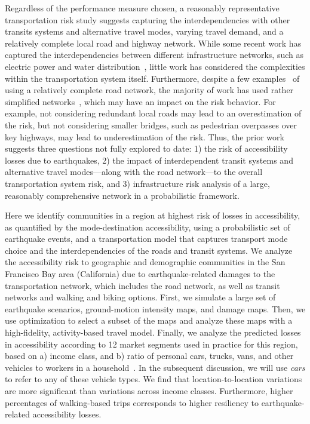 Regardless of the performance measure chosen, a reasonably representative transportation risk study suggests capturing the interdependencies with other transits systems and alternative travel modes, varying travel demand, and a relatively complete local road and highway network. While some recent work has captured the interdependencies between different infrastructure networks, such as electric power and water distribution~\cite{duenas-osorio_seismic_2007}, little work has considered the complexities within the transportation system itself. Furthermore, despite a few examples~\cite[e.g.,][]{kiremidjian_seismic_2007} of using a relatively complete road network, the majority of work has used rather simplified networks~\cite[e.g.,][]{lee_post-hazard_2011,jayaram_efficient_2010}, which may have an impact on the risk behavior. For example, not considering redundant local roads may lead to an overestimation of the risk, but not considering smaller bridges, such as pedestrian overpasses over key highways, may lead to underestimation of the risk. 
Thus, the prior work suggests three questions not fully explored to date: 1) the risk of accessibility losses due to earthquakes, 2) the impact of interdependent transit systems and alternative travel modes---along with the road network---to the overall transportation system risk, and 3) infrastructure risk analysis of a large, reasonably comprehensive network in a probabilistic framework.

Here we identify communities in a region at highest risk of losses in accessibility, as quantified by the mode-destination accessibility, using a probabilistic set of earthquake events, and a transportation model that captures transport mode choice and the interdependencies of the roads and transit systems.
We analyze the accessibility risk to geographic and demographic communities in the San Francisco Bay area (California) due to earthquake-related damages to the transportation network, which includes the road network, as well as transit networks and walking and biking options. First, we simulate a large set of earthquake scenarios, ground-motion intensity maps, and damage maps. Then, we use optimization to select a subset of the maps and analyze these maps with a high-fidelity, activity-based travel model. Finally, we analyze the predicted losses in accessibility according to 12 market segments used in practice for this region, based on a) income class,  and b) ratio of personal cars, trucks, vans, and other vehicles to workers in a household~\cite{org_mtc_2014}. In the subsequent discussion, we will use \emph{cars} to refer to any of these vehicle types. We find that location-to-location variations are more significant than variations across income classes. Furthermore, higher percentages of walking-based trips corresponds to higher resiliency to earthquake-related accessibility losses.
